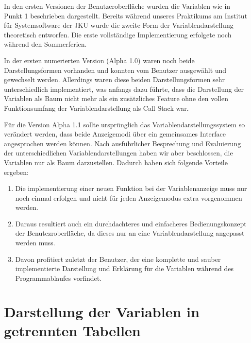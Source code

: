 In den ersten Versionen der Benutzeroberfläche wurden die Variablen wie in Punkt 1 beschrieben dargestellt. Bereits während unseres Praktikums am Institut für Systemsoftware der JKU wurde die zweite Form der Variablendarstellung theoretisch entworfen. Die erste vollständige Implementierung erfolgete noch während den Sommerferien.
\newline

In der ersten numerierten Version (Alpha 1.0) waren noch beide Darstellungsformen vorhanden und konnten vom Benutzer ausgewählt und gewechselt werden. Allerdings waren diese beiden Darstellungsformen sehr unterschiedlich implementiert, was anfangs dazu führte, dass die Darstellung der Variablen als Baum nicht mehr als ein zusätzliches Feature ohne den vollen Funktionsumfang der Variablendarstellung als Call Stack war.
\newline

Für die Version Alpha 1.1 sollte ursprünglich das Variablendarstellungssystem so verändert werden, dass beide Anzeigemodi über ein gemeinsames Interface angesprochen werden können. Nach ausführlicher Besprechung und Evaluierung der unterschiedlichen Variablendarstellungen haben wir aber beschlossen, die Variablen nur als Baum darzustellen. Dadurch haben sich folgende Vorteile ergeben:
\begin{enumerate}
\item Die implementierung einer neuen Funktion bei der Variablenanzeige muss nur noch einmal erfolgen und nicht für jeden Anzeigemodus extra vorgenommen werden.
\item Daraus resultiert auch ein durchdachteres und einfacheres Bedienungskonzept der Benutezroberfläche, da dieses nur an eine Variablendarstellung angepasst werden muss.
\item Davon profitiert zuletzt der Benutzer, der eine komplette und sauber implementierte Darstellung und Erklärung für die Variablen während des Programmablaufes vorfindet.
\end{enumerate}

\section{Darstellung der Variablen in getrennten Tabellen}


